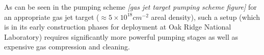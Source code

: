 As can be seen in the pumping scheme \emph{[gas jet target pumping scheme figure]} for an appropriate gas jet target ($\approx 5\times10^{18} \unit{cm^{-2}}$ areal density), such a setup (which is in its early construction phases for deployment at Oak Ridge National Laboratory) requires significantly more powerful pumping stages as well as expensive gas compression and cleaning.\\
 





